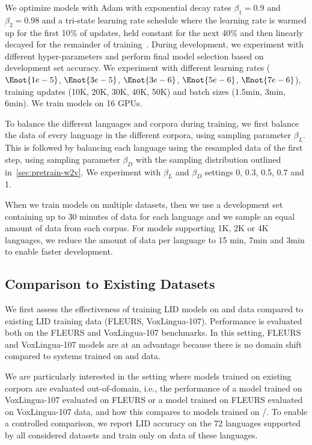 We optimize models with Adam with exponential decay rates $\beta_1=0.9$ and $\beta_2=0.98$ and a tri-state learning rate schedule where the learning rate is warmed up for the first 10\% of updates, held constant for the next 40\% and then linearly decayed for the remainder of training~\citep{kingma2015adam}.
During development, we experiment with different hyper-parameters and perform final model selection based on development set accuracy.
We experiment with different learning rates ($\Enot{1e-5}$, $\Enot{3e-5}$, $\Enot{3e-6}$, $\Enot{5e-6}$, $\Enot{7e-6}$), training updates (10K, 20K, 30K, 40K, 50K) and batch sizes (1.5min, 3min, 6min). 
We train models on 16 GPUs.

To balance the different languages and corpora during training, we first balance the data of every language in the different corpora, using sampling parameter $\beta_L$. This is followed by balancing each language using the resampled data of the first step, using sampling parameter $\beta_D$ with the sampling distribution outlined in~\textsection\ref{sec:pretrain-w2v}.
We experiment with $\beta_L$ and $\beta_D$ settings 0, 0.3, 0.5, 0.7 and 1.

When we train models on multiple datasets, then we use a development set containing up to 30 minutes of data for each language and we sample an equal amount of data from each corpus.
For models supporting 1K, 2K or 4K languages, we reduce the amount of data per language to 15 min, 7min and 3min to enable faster development.



\subsection{Comparison to Existing Datasets}
\label{sec:lid-existing-data}

\insertResultsLIDFLVLCompare


We first assess the effectiveness of training LID models on \MMSU{} and \GRN{} data compared to existing LID training data (FLEURS, VoxLingua-107).
Performance is evaluated both on the FLEURS and VoxLingua-107 benchmarks.
In this setting, FLEURS and VoxLingua-107 models are at an advantage because there is no domain shift compared to systems trained on \MMSU{} and \GRN{} data.

We are particularly interested in the setting where models trained on existing corpora are evaluated out-of-domain, i.e., the performance of a model trained on VoxLingua-107 evaluated on FLEURS or a model trained on FLEURS evaluated on VoxLingua-107 data, and how this compares to models trained on \MMSU{}/\GRN{}.
To enable a controlled comparison, we report LID accuracy on the 72 languages supported by all considered datasets and train only on data of these languages.


